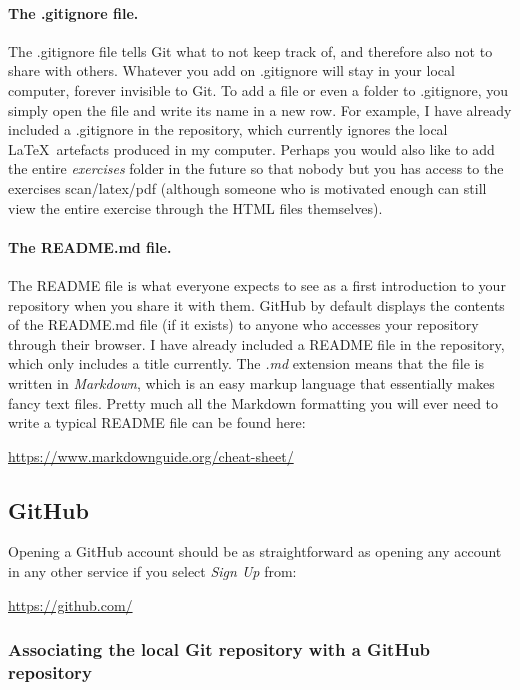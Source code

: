 \documentclass[a4paper,10pt]{article}
\begin{document}
\paragraph{The .gitignore file.} The .gitignore file tells Git what to not keep track of, and therefore also not to share with others. Whatever you add on .gitignore will stay in your local computer, forever invisible to Git. To add a file or even a folder to .gitignore, you simply open the file and write its name in a new row. For example, I have already included a .gitignore in the repository, which currently ignores the local \LaTeX\ artefacts produced in my computer. Perhaps you would also like to add the entire \emph{exercises} folder in the future so that nobody but you has access to the exercises scan/latex/pdf (although someone who is motivated enough can still view the entire exercise through the HTML files themselves).

\paragraph{The README.md file.} The README file is what everyone expects to see as a first introduction to your repository when you share it with them. GitHub by default displays the contents of the README.md file (if it exists) to anyone who accesses your repository through their browser. I have already included a README file in the repository, which only includes a title currently. The \emph{.md} extension means that the file is written in \emph{Markdown}, which is an easy markup language that essentially makes fancy text files. Pretty much all the Markdown formatting you will ever need to write a typical README file can be found here:

\url{https://www.markdownguide.org/cheat-sheet/}


\subsection{GitHub}

Opening a GitHub account should be as straightforward as opening any account in any other service if you select \emph{Sign Up} from: 

\url{https://github.com/}


\subsubsection{Associating the local Git repository with a GitHub repository}
\end{document}

